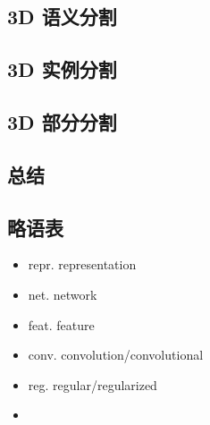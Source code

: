\documentclass{article}
\begin{document}
\subsection{3D 语义分割}
\subsection{3D 实例分割}
\subsection{3D 部分分割}
\subsection{总结}

\subsection{略语表}
\begin{itemize}
    \item repr. \trarr representation
    \item net. \trarr network
    \item feat. \trarr feature
    \item conv. \trarr convolution/convolutional
    \item reg. \trarr regular/regularized
    \item 
\end{itemize}
\end{document}
